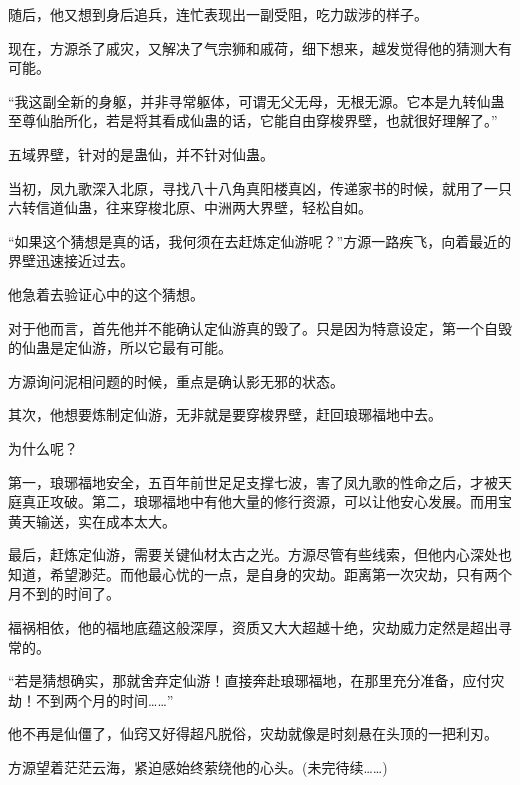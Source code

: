 \begin{this_body}
随后，他又想到身后追兵，连忙表现出一副受阻，吃力跋涉的样子。

现在，方源杀了戚灾，又解决了气宗狮和戚荷，细下想来，越发觉得他的猜测大有可能。

“我这副全新的身躯，并非寻常躯体，可谓无父无母，无根无源。它本是九转仙蛊至尊仙胎所化，若是将其看成仙蛊的话，它能自由穿梭界壁，也就很好理解了。”

五域界壁，针对的是蛊仙，并不针对仙蛊。

当初，凤九歌深入北原，寻找八十八角真阳楼真凶，传递家书的时候，就用了一只六转信道仙蛊，往来穿梭北原、中洲两大界壁，轻松自如。

“如果这个猜想是真的话，我何须在去赶炼定仙游呢？”方源一路疾飞，向着最近的界壁迅速接近过去。

他急着去验证心中的这个猜想。

对于他而言，首先他并不能确认定仙游真的毁了。只是因为特意设定，第一个自毁的仙蛊是定仙游，所以它最有可能。

方源询问泥相问题的时候，重点是确认影无邪的状态。

其次，他想要炼制定仙游，无非就是要穿梭界壁，赶回琅琊福地中去。

为什么呢？

第一，琅琊福地安全，五百年前世足足支撑七波，害了凤九歌的性命之后，才被天庭真正攻破。第二，琅琊福地中有他大量的修行资源，可以让他安心发展。而用宝黄天输送，实在成本太大。

最后，赶炼定仙游，需要关键仙材太古之光。方源尽管有些线索，但他内心深处也知道，希望渺茫。而他最心忧的一点，是自身的灾劫。距离第一次灾劫，只有两个月不到的时间了。

福祸相依，他的福地底蕴这般深厚，资质又大大超越十绝，灾劫威力定然是超出寻常的。

“若是猜想确实，那就舍弃定仙游！直接奔赴琅琊福地，在那里充分准备，应付灾劫！不到两个月的时间……”

他不再是仙僵了，仙窍又好得超凡脱俗，灾劫就像是时刻悬在头顶的一把利刃。

方源望着茫茫云海，紧迫感始终萦绕他的心头。(未完待续……)

\end{this_body}

